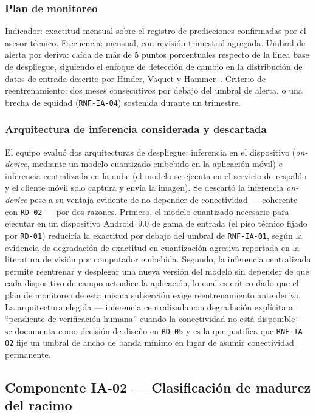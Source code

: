 \documentclass[11pt,a4paper]{article}
\newcommand{\id}[1]{\texttt{#1}}
\begin{document}
\subsubsection{Plan de monitoreo}

Indicador: exactitud mensual sobre el registro de predicciones confirmadas por el asesor técnico.
Frecuencia: mensual, con revisión trimestral agregada. Umbral de alerta por deriva: caída de más de
5 puntos porcentuales respecto de la línea base de despliegue, siguiendo el enfoque de detección de
cambio en la distribución de datos de entrada descrito por Hinder, Vaquet y
Hammer~\cite{hinder2024}. Criterio de reentrenamiento: dos meses consecutivos por debajo del
umbral de alerta, o una brecha de equidad (\id{RNF-IA-04}) sostenida durante un trimestre.

\subsubsection{Arquitectura de inferencia considerada y descartada}

El equipo evaluó dos arquitecturas de despliegue: inferencia en el dispositivo (\emph{on-device},
mediante un modelo cuantizado embebido en la aplicación móvil) e inferencia centralizada en la nube
(el modelo se ejecuta en el servicio de respaldo y el cliente móvil solo captura y envía la
imagen). Se descartó la inferencia \emph{on-device} pese a su ventaja evidente de no depender de
conectividad --- coherente con \id{RD-02} --- por dos razones. Primero, el modelo cuantizado
necesario para ejecutar en un dispositivo Android~9.0 de gama de entrada (el piso técnico fijado por
\id{RD-01}) reduciría la exactitud por debajo del umbral de \id{RNF-IA-01}, según la evidencia de
degradación de exactitud en cuantización agresiva reportada en la literatura de visión por
computador embebida. Segundo, la inferencia centralizada permite reentrenar y desplegar una nueva
versión del modelo sin depender de que cada dispositivo de campo actualice la aplicación, lo cual es
crítico dado que el plan de monitoreo de esta misma subsección exige reentrenamiento ante deriva. La
arquitectura elegida --- inferencia centralizada con degradación explícita a ``pendiente de
verificación humana'' cuando la conectividad no está disponible --- se documenta como decisión de
diseño en \id{RD-05} y es la que justifica que \id{RNF-IA-02} fije un umbral de ancho de banda
mínimo en lugar de asumir conectividad permanente.

\subsection{Componente IA-02 --- Clasificación de madurez del racimo}
\end{document}
